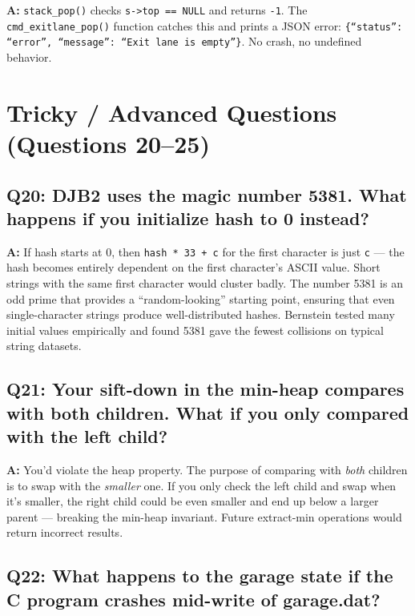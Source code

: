 \documentclass[12pt, a4paper]{article}
\begin{document}
\textbf{A:} \texttt{stack\_pop()} checks \texttt{s->top == NULL} and returns \texttt{-1}. The \texttt{cmd\_exitlane\_pop()} function catches this and prints a JSON error: \texttt{\{``status'': ``error'', ``message'': ``Exit lane is empty''\}}. No crash, no undefined behavior.

\section{Tricky / Advanced Questions (Questions 20--25)}

\subsection{Q20: DJB2 uses the magic number 5381. What happens if you initialize hash to 0 instead?}

\textbf{A:} If hash starts at 0, then \texttt{hash * 33 + c} for the first character is just \texttt{c} --- the hash becomes entirely dependent on the first character's ASCII value. Short strings with the same first character would cluster badly. The number 5381 is an odd prime that provides a ``random-looking'' starting point, ensuring that even single-character strings produce well-distributed hashes. Bernstein tested many initial values empirically and found 5381 gave the fewest collisions on typical string datasets.

\subsection{Q21: Your sift-down in the min-heap compares with both children. What if you only compared with the left child?}

\textbf{A:} You'd violate the heap property. The purpose of comparing with \emph{both} children is to swap with the \emph{smaller} one. If you only check the left child and swap when it's smaller, the right child could be even smaller and end up below a larger parent --- breaking the min-heap invariant. Future extract-min operations would return incorrect results.

\subsection{Q22: What happens to the garage state if the C program crashes mid-write of garage.dat?}
\end{document}
